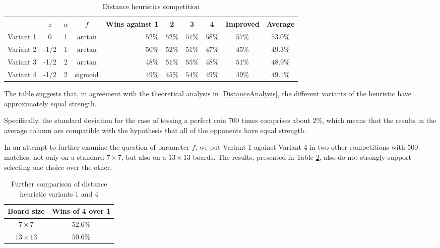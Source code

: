 \documentclass[oneside]{article}   	%
\begin{document}
\begin{table}[htp]
\caption{Distance heuristics competition}
\begin{center}
\begin{tabular}{c|ccc|rcccc|c}
   & $z$ & $\alpha$ & $f$ & Wins against 1 & 2 & 3 & 4 & Improved & Average \\
   \hline
 Variant 1 &    0 & 1 & $\arctan$  & $52\%$ & $52\%$ & $51\%$ & $58\%$ & $57\%$ & $53.0\%$ \\
 Variant 2 & -1/2 & 1 & $\arctan$  & $50\%$ & $52\%$ & $51\%$ & $47\%$ & $45\%$ & $49.3\%$ \\
 Variant 3 & -1/2 & 2 & $\arctan$  & $48\%$ & $51\%$ & $55\%$ & $48\%$ & $51\%$ & $48.9\%$ \\
 Variant 4 & -1/2 & 2 & sigmoid    & $49\%$ & $45\%$ & $54\%$ & $49\%$ & $49\%$ & $49.1\%$
 
\end{tabular}
\end{center}
\label{DistanceCompetition}
\end{table}%

The table suggests that, in agreement with the theoretical analysis in \ref{DistanceAnalysis}, the different variants of the heuristic have approximately equal strength.

Specifically, the standard deviation for the case of tossing a perfect coin 700 times comprises about 2\%, which means that the results in the average column are compatible with the hypothesis that all of the opponents have equal strength. 

In an attempt to further examine the question of parameter $f$, we put Variant 1 against Variant 4 in two other competitions with 500 matches, not only on a standard $7\times 7$, but also on a $13\times 13$ boards. The results, presented in Table \ref{DistanceBoards}, also do not strongly support selecting one choice over the other. 

\begin{table}[htp]
\caption{Further comparison of distance heuristic variants 1 and 4}
\begin{center}
\begin{tabular}{c|c}
   Board size & Wins of 4 over 1 \\
   \hline
 $7\times 7$   & $52.6\%$ \\
 $13\times 13$ & $50.6\%$
 
\end{tabular}
\end{center}
\label{DistanceBoards}
\end{table}%
\end{document}

